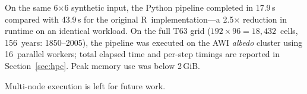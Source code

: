 \documentclass[preprint,12pt,a4paper]{elsarticle}
\newcommand{\revr}[1]{{\color{RevisionRed}#1}}
\begin{document}
On the same 6$\times$6 synthetic input, the Python pipeline
completed in 17.9\,s compared with 43.9\,s for the original
R~implementation---a 2.5$\times$ reduction in runtime on an
identical workload.
On the full T63 grid ($192\times 96 = 18{,}432$~cells, 156~years:
1850--2005), the pipeline was executed on the AWI \emph{albedo}
cluster using 16~parallel workers; total elapsed time and
per-step timings are reported in Section~\ref{sec:hpc}.
Peak memory use was below 2\,GiB.

\revr{Multi-node execution is left for future work.}

\end{document}
